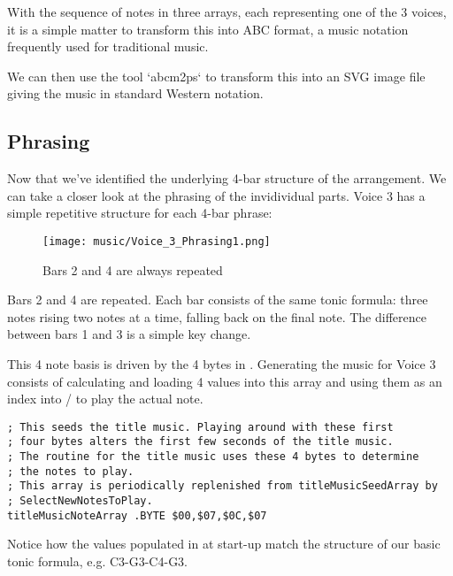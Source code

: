 \begin{tcolorbox}[%
  breakable,
  parbox = false,
  frame hidden,
  sharp corners,
  after skip=10pt,
  overlay broken = {
    \draw[]
      (frame.north west) rectangle (frame.south east);},
]{}
With the sequence of notes in three arrays, each representing one of the 3 voices, it is a simple
matter to transform this into ABC format, a music notation frequently used for traditional music.



We can then use the tool `abcm2ps` to transform this into an SVG image file giving the music in
standard Western notation.

\end{tcolorbox}%

\subsection{Phrasing}
Now that we've identified the underlying 4-bar structure of the arrangement. We can take a closer look at the 
phrasing of the invidividual parts. Voice 3 has a simple repetitive structure for each 4-bar phrase:

\begin{figure}[H]
{
  \begin{adjustbox}{width=11cm,center}
  \texttt{[image: music/Voice\_3\_Phrasing1.png]}%
    \end{adjustbox}
}\caption[]{Bars 2 and 4 are always repeated}
\end{figure}

Bars 2 and 4 are repeated. Each bar consists of the same tonic formula: three notes rising two notes at a time,
falling back on the final note. The difference between bars 1 and 3 is a simple key change.

This 4 note basis is driven by the 4 bytes in . Generating the music for Voice 3
consists of calculating and loading 4 values into this array and using them as an index into  
/ to play the actual note.

\begin{lstlisting}
; This seeds the title music. Playing around with these first
; four bytes alters the first few seconds of the title music.
; The routine for the title music uses these 4 bytes to determine
; the notes to play.
; This array is periodically replenished from titleMusicSeedArray by
; SelectNewNotesToPlay.
titleMusicNoteArray .BYTE $00,$07,$0C,$07
\end{lstlisting}

Notice how the values populated in  at start-up match the structure of our basic
tonic formula, e.g. C3-G3-C4-G3.

